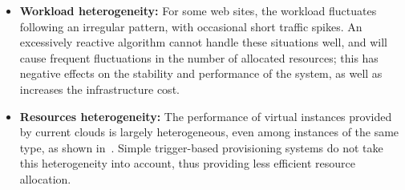 \begin{itemize}
\item  \textbf{Workload heterogeneity:} For some web sites, the 
workload fluctuates following an irregular pattern, with occasional
short traffic spikes. An excessively reactive algorithm cannot handle
these situations well, and will cause frequent fluctuations in the number
of allocated resources; this has negative effects on the stability and
performance of the system, as well as increases the infrastructure cost. 






\item  \textbf{Resources heterogeneity:} The performance of virtual instances 
provided by current clouds is largely heterogeneous, even among
instances of the same type, as shown in~\cite{ec2Performance}.
Simple trigger-based provisioning systems do not take this heterogeneity
into account, thus providing less efficient resource allocation. 


\end{itemize}

